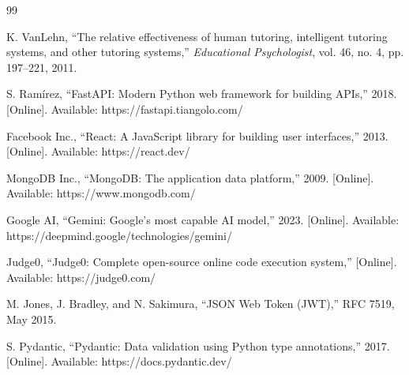 \documentclass[conference]{IEEEtran}
\begin{document}
\begin{thebibliography}{99}

K. VanLehn, ``The relative effectiveness of human tutoring, intelligent tutoring systems, and other tutoring systems,'' \textit{Educational Psychologist}, vol. 46, no. 4, pp. 197--221, 2011.

S. Ramírez, ``FastAPI: Modern Python web framework for building APIs,'' 2018. [Online]. Available: https://fastapi.tiangolo.com/

Facebook Inc., ``React: A JavaScript library for building user interfaces,'' 2013. [Online]. Available: https://react.dev/

MongoDB Inc., ``MongoDB: The application data platform,'' 2009. [Online]. Available: https://www.mongodb.com/

Google AI, ``Gemini: Google's most capable AI model,'' 2023. [Online]. Available: https://deepmind.google/technologies/gemini/

Judge0, ``Judge0: Complete open-source online code execution system,'' [Online]. Available: https://judge0.com/

M. Jones, J. Bradley, and N. Sakimura, ``JSON Web Token (JWT),'' RFC 7519, May 2015.

S. Pydantic, ``Pydantic: Data validation using Python type annotations,'' 2017. [Online]. Available: https://docs.pydantic.dev/

\end{thebibliography}
\end{document}
